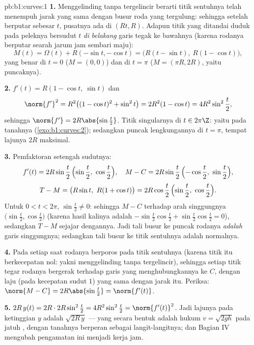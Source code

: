 \begin{solution}{pb:b1:curves:1}
\textbf{1.} Menggelinding tanpa tergelincir berarti titik sentuhnya telah
menempuh jarak yang sama dengan busur roda yang tergulung: sehingga setelah
berputar sebesar $t$, pusatnya ada di $(Rt, R)$. Adapun titik yang ditandai duduk
pada peleknya bersudut $t$ \emph{di belakang} garis tegak ke bawahnya
(karena rodanya berputar searah jarum jam sembari maju):
\[
M(t) = \Omega(t) + R(-\sin t, -\cos t)
= \bigl(R(t - \sin t),\ R(1 - \cos t)\bigr),
\]
yang benar di $t = 0$ ($M = (0,0)$) dan di $t = \pi$ ($M =
(\pi R, 2R)$, yaitu puncaknya).

\textbf{2.} $f'(t) = R(1 - \cos t,\ \sin t)$ dan
\[
\norm{f'}^2 = R^2\bigl((1-\cos t)^2 + \sin^2 t\bigr)
= 2R^2(1 - \cos t) = 4R^2\sin^2\frac t2 ,
\]
sehingga $\norm{f'} = 2R\abs{\sin\frac t2}$. Titik singularnya di $t \in
2\pi\Z$: yaitu  pada tanahnya (\cref{exo:b1:curves:2}); sedangkan
puncak lengkungannya di $t = \pi$, tempat lajunya $2R$ maksimal.

\textbf{3.} Pemfaktoran setengah sudutnya:
\[
f'(t) = 2R\sin\frac t2\,\Bigl(\sin\frac t2,\ \cos\frac t2\Bigr),
\quad
M - C = 2R\sin\frac t2\,\Bigl(-\cos\frac t2,\ \sin\frac t2\Bigr),
\]
\[
T - M = \bigl(R\sin t,\ R(1 + \cos t)\bigr)
= 2R\cos\frac t2\,\Bigl(\sin\frac t2,\ \cos\frac t2\Bigr).
\]
Untuk $0 < t < 2\pi$, $\sin\frac t2 \neq 0$: sehingga $M - C$ 
terhadap arah singgungnya $\bigl(\sin\frac t2, \cos\frac
t2\bigr)$ (karena hasil kalinya adalah $-\sin\frac t2\cos\frac t2 +
\sin\frac t2\cos\frac t2 = 0$), sedangkan $T - M$ sejajar dengannya.
Jadi tali busur ke puncak rodanya \emph{adalah} garis singgungnya; sedangkan
tali busur ke titik sentuhnya adalah normalnya.

\textbf{4.} Pada setiap saat rodanya berporos pada titik
sentuhnya (karena titik itu berkecepatan nol: yakni menggelinding tanpa tergelincir),
sehingga setiap titik tegar rodanya bergerak  terhadap garis
yang menghubungkannya ke $C$, dengan laju (pada kecepatan sudut $1$) yang sama dengan
jarak itu. Periksa: $\norm{M - C} = 2R\abs{\sin\frac t2} =
\norm{f'(t)}$.

\textbf{5.} $2R\,y(t) = 2R\cdot 2R\sin^2\frac t2 =
4R^2\sin^2\frac t2 = \norm{f'(t)}^2$. Jadi lajunya pada ketinggian $y$ adalah
$\sqrt{2R\,y}$ --- yang secara bentuk adalah hukum $v = \sqrt{2gh}$ pada jatuh
, dengan tanahnya berperan sebagai langit-langitnya; dan Bagian IV mengubah
pengamatan ini menjadi kerja jam.


\end{solution}
